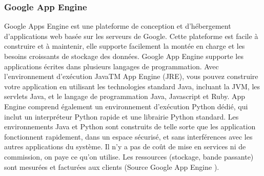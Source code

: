 \documentclass[a4paper,12pt]{report}
\begin{document}
\begin{onehalfspace}
	\subsubsection*{Google App Engine}
	Google Apps Engine est une plateforme de conception et d’hébergement d’applications web basée sur les serveurs de Google. Cette plateforme est facile à construire et à maintenir, elle supporte facilement la montée en charge et les besoins croissants de stockage des données. Google App Engine supporte les applications écrites dans plusieurs langages de programmation. Avec l'environnement d'exécution JavaTM App Engine (JRE), vous pouvez construire votre application en utilisant les technologies standard Java, incluant la JVM, les servlets Java, et le langage de programmation Java, Javascript et Ruby. App Engine comprend également un environnement d'exécution Python dédié, qui inclut un interpréteur Python rapide et une librairie Python standard. Les environnements Java et Python sont construits de telle sorte que les application fonctionnent rapidement, dans un espace sécurisé, et sans interférences avec les autres applications du système. Il n’y a pas de coût de mise en services ni de commission, on paye ce qu’on utilise. Les ressources (stockage, bande passante) sont mesurées et facturées aux clients (Source Google App Engine \cite{source:ggappengine}).


\end{onehalfspace}
\end{document}
